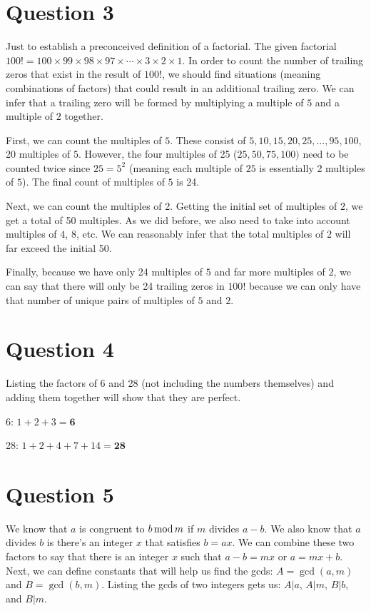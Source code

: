 \documentclass[letterpaper, 12pt]{article}
\begin{document}
\section*{Question 3}
Just to establish a preconceived definition of a factorial. The given factorial $100! = 100 \times 99 \times 98 \times 97 \times \cdots \times 3 \times 2 \times 1$. In order to count the number of trailing zeros that exist in the result of $100!$, we should find situations (meaning combinations of factors) that could result in an additional trailing zero. We can infer that a trailing zero will be formed by multiplying a multiple of $5$ and a multiple of $2$ together.

First, we can count the multiples of $5$. These consist of $5, 10, 15, 20, 25,\ldots, 95, 100$, 20 multiples of $5$. However, the four multiples of 25 ($25, 50, 75, 100)$ need to be counted twice since $25=5^2$ (meaning each multiple of $25$ is essentially 2 multiples of $5$). The final count of multiples of $5$ is 24.

Next, we can count the multiples of 2. Getting the initial set of multiples of $2$, we get a total of 50 multiples. As we did before, we also need to take into account multiples of $4$, $8$, etc. We can reasonably infer that the total multiples of $2$ will far exceed the initial 50.

Finally, because we have only 24 multiples of $5$ and far more multiples of $2$, we can say that there will only be 24 trailing zeros in $100!$ because we can only have that number of unique pairs of multiples of $5$ and $2$.

\section*{Question 4}
Listing the factors of 6 and 28 (not including the numbers themselves) and adding them together will show that they are perfect.

6: $1+2+3=\textbf{6}$

28: $1+2+4+7+14=\textbf{28}$

\section*{Question 5}
We know that $a$ is congruent to $b \mathinner{\text{mod}} m$ if $m$ divides $a-b$. We also know that $a$ divides $b$ is there's an integer $x$ that satisfies $b = ax$. We can combine these two factors to say that there is an integer $x$ such that $a - b = mx$ or $a = mx + b$. Next, we can define constants that will help us find the gcds: $A = \gcd(a, m)$ and $B = \gcd(b,m)$. Listing the gcds of two integers gets us: $A|a$, $A|m$, $B|b$, and $B|m$.
\end{document}
